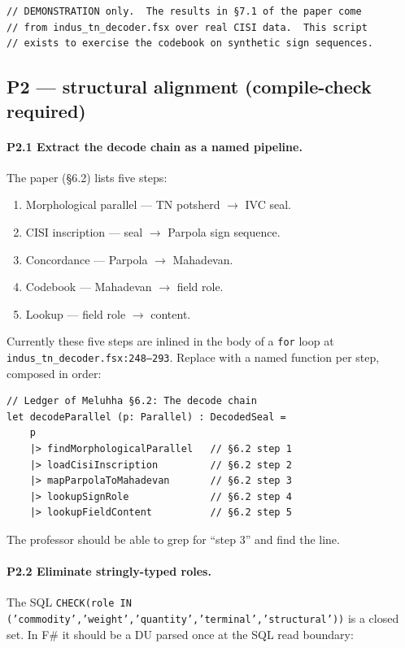 \documentclass[11pt]{article}
\begin{document}
\begin{Verbatim}[fontsize=\small]
// DEMONSTRATION only.  The results in §7.1 of the paper come
// from indus_tn_decoder.fsx over real CISI data.  This script
// exists to exercise the codebook on synthetic sign sequences.
\end{Verbatim}

\subsection{P2 --- structural alignment (compile-check required)}

\paragraph{P2.1 Extract the decode chain as a named pipeline.}
The paper (\S6.2) lists five steps:

\begin{enumerate}[leftmargin=2em]
\item Morphological parallel --- TN potsherd $\to$ IVC seal.
\item CISI inscription --- seal $\to$ Parpola sign sequence.
\item Concordance --- Parpola $\to$ Mahadevan.
\item Codebook --- Mahadevan $\to$ field role.
\item Lookup --- field role $\to$ content.
\end{enumerate}

Currently these five steps are inlined in the body of a
\texttt{for} loop at \texttt{indus\_tn\_decoder.fsx:248--293}.
Replace with a named function per step, composed in order:

\begin{Verbatim}[fontsize=\small,frame=single]
// Ledger of Meluhha §6.2: The decode chain
let decodeParallel (p: Parallel) : DecodedSeal =
    p
    |> findMorphologicalParallel   // §6.2 step 1
    |> loadCisiInscription         // §6.2 step 2
    |> mapParpolaToMahadevan       // §6.2 step 3
    |> lookupSignRole              // §6.2 step 4
    |> lookupFieldContent          // §6.2 step 5
\end{Verbatim}

The professor should be able to grep for ``step 3'' and find the
line.

\paragraph{P2.2 Eliminate stringly-typed roles.}
The SQL \texttt{CHECK(role IN
('commodity','weight','quantity','terminal','structural'))} is
a closed set.  In F\# it should be a DU parsed once at the SQL
read boundary:
\end{document}
